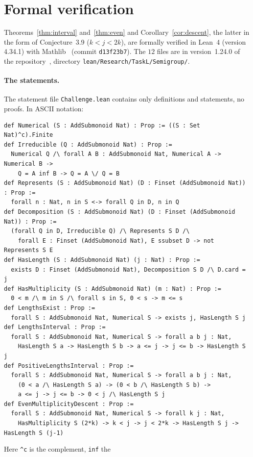 \documentclass[11pt]{article}
\theoremstyle{definition}
\theoremstyle{remark}
\newcommand{\repoversion}{1.24.0}
\begin{document}
{\sloppy
\section{Formal verification}\label{sec:lean}

Theorems~\ref{thm:interval} and~\ref{thm:even} and Corollary~\ref{cor:descent}, the latter in the form of Conjecture~3.9 ($k<j<2k$), are formally verified in Lean~4 (version 4.34.1)
with Mathlib~\cite{mathlib} (commit \texttt{d13f23b7}). The $12$ files are in
version~\repoversion{} of the repository~\cite{repo}, directory
\texttt{lean/Research/TaskL/Semigroup/}.

\paragraph{The statements.}
The statement file \texttt{Challenge.lean} contains only definitions and
statements, no proofs. In ASCII notation:
{\footnotesize
\begin{verbatim}
def Numerical (S : AddSubmonoid Nat) : Prop := ((S : Set Nat)^c).Finite
def Irreducible (Q : AddSubmonoid Nat) : Prop :=
  Numerical Q /\ forall A B : AddSubmonoid Nat, Numerical A -> Numerical B ->
    Q = A inf B -> Q = A \/ Q = B
def Represents (S : AddSubmonoid Nat) (D : Finset (AddSubmonoid Nat)) : Prop :=
  forall n : Nat, n in S <-> forall Q in D, n in Q
def Decomposition (S : AddSubmonoid Nat) (D : Finset (AddSubmonoid Nat)) : Prop :=
  (forall Q in D, Irreducible Q) /\ Represents S D /\
    forall E : Finset (AddSubmonoid Nat), E ssubset D -> not Represents S E
def HasLength (S : AddSubmonoid Nat) (j : Nat) : Prop :=
  exists D : Finset (AddSubmonoid Nat), Decomposition S D /\ D.card = j
def HasMultiplicity (S : AddSubmonoid Nat) (m : Nat) : Prop :=
  0 < m /\ m in S /\ forall s in S, 0 < s -> m <= s
def LengthsExist : Prop :=
  forall S : AddSubmonoid Nat, Numerical S -> exists j, HasLength S j
def LengthsInterval : Prop :=
  forall S : AddSubmonoid Nat, Numerical S -> forall a b j : Nat,
    HasLength S a -> HasLength S b -> a <= j -> j <= b -> HasLength S j
def PositiveLengthsInterval : Prop :=
  forall S : AddSubmonoid Nat, Numerical S -> forall a b j : Nat,
    (0 < a /\ HasLength S a) -> (0 < b /\ HasLength S b) ->
    a <= j -> j <= b -> 0 < j /\ HasLength S j
def EvenMultiplicityDescent : Prop :=
  forall S : AddSubmonoid Nat, Numerical S -> forall k j : Nat,
    HasMultiplicity S (2*k) -> k < j -> j < 2*k -> HasLength S j -> HasLength S (j-1)
\end{verbatim}}
\noindent Here \texttt{\^{}c} is the complement, \texttt{inf} the
}
\end{document}
